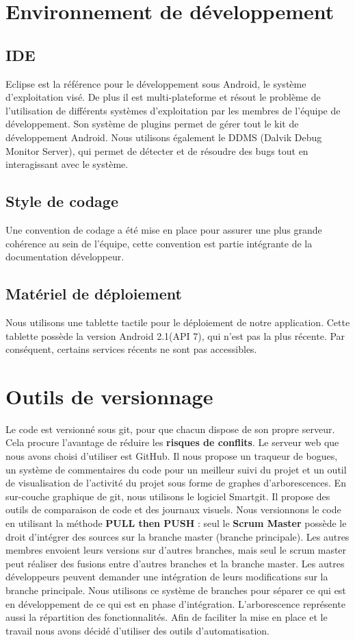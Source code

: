 \section{Environnement de développement}
\subsection{IDE}
Eclipse est la référence pour le développement sous Android, le système d'exploitation visé. De plus il est multi-plateforme et résout le problème de l'utilisation de différents systèmes d'exploitation par les membres de l'équipe de développement.
Son système de plugins permet de gérer tout le kit de développement Android. Nous utilisons également le DDMS (Dalvik Debug Monitor Server), qui permet de détecter et de résoudre des bugs tout en interagissant avec le système. 

\subsection{Style de codage}
Une convention de codage a été mise en place pour assurer une plus grande cohérence au sein de l'équipe, cette convention est partie intégrante de la documentation développeur.

\subsection{Matériel de déploiement}
Nous utilisons une tablette tactile pour le déploiement de notre application. Cette tablette possède la version Android 2.1(API 7), qui n'est pas la plus récente. Par conséquent, certains services récents ne sont pas accessibles. 

\section{Outils de versionnage}
Le code est versionné sous git, pour que chacun dispose de son propre serveur. Cela procure l'avantage de réduire les \textbf{risques de conflits}. Le serveur web que nous avons choisi 
d'utiliser est GitHub. Il nous propose un traqueur de bogues, un système de commentaires du code pour un meilleur suivi du projet et un outil de visualisation de l'activité du projet sous forme de graphes d'arborescences. En sur-couche graphique de git, nous utilisons le logiciel Smartgit. Il propose des outils de comparaison de code et des
journaux visuels.
Nous versionnons le code en utilisant la méthode \textbf{PULL then PUSH} : seul le \textbf{Scrum Master} possède le droit d'intégrer des
sources sur la branche master (branche principale). Les autres membres envoient leurs versions sur d'autres
branches, mais seul le scrum master peut réaliser des fusions entre d'autres branches et la branche master. Les
autres développeurs peuvent demander une intégration de leurs modifications sur la branche principale. Nous utilisons ce système de branches pour séparer ce qui est en développement de ce qui est en phase d'intégration. L'arborescence représente aussi la répartition des fonctionnalités.
Afin de faciliter la mise en place et le travail nous avons décidé d'utiliser des outils d'automatisation.

